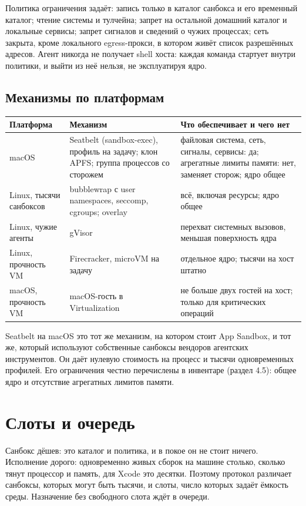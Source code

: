 Политика ограничения задаёт: запись только в каталог санбокса и его временный каталог; чтение системы и тулчейна; запрет на остальной домашний каталог и локальные сервисы; запрет сигналов и сведений о чужих процессах; сеть закрыта, кроме локального egress-прокси, в котором живёт список разрешённых адресов. Агент никогда не получает shell хоста: каждая команда стартует внутри политики, и выйти из неё нельзя, не эксплуатируя ядро.

\subsection{Механизмы по платформам}

\begin{center}
\small
\begin{tabular}{p{2.3cm} p{5.3cm} p{6.0cm}}
\toprule
Платформа & Механизм & Что обеспечивает и чего нет \\
\midrule
macOS & Seatbelt (sandbox-exec), профиль на задачу; клон APFS; группа процессов со сторожем & файловая система, сеть, сигналы, сервисы: да; агрегатные лимиты памяти: нет, заменяет сторож; ядро общее \\
Linux, тысячи санбоксов & bubblewrap с user namespaces, seccomp, cgroups; overlay & всё, включая ресурсы; ядро общее \\
Linux, чужие агенты & gVisor & перехват системных вызовов, меньшая поверхность ядра \\
Linux, прочность VM & Firecracker, microVM на задачу & отдельное ядро; тысячи на хост штатно \\
macOS, прочность VM & macOS-гость в Virtualization & не больше двух гостей на хост; только для критических операций \\
\bottomrule
\end{tabular}
\end{center}

Seatbelt на macOS это тот же механизм, на котором стоит App Sandbox, и тот же, который используют собственные санбоксы вендоров агентских инструментов. Он даёт нулевую стоимость на процесс и тысячи одновременных профилей. Его ограничения честно перечислены в инвентаре (раздел 4.5): общее ядро и отсутствие агрегатных лимитов памяти.

\section{Слоты и очередь}

Санбокс дёшев: это каталог и политика, и в покое он не стоит ничего. Исполнение дорого: одновременно живых сборок на машине столько, сколько тянут процессор и память, для Xcode это десятки. Поэтому протокол различает санбоксы, которых могут быть тысячи, и слоты, число которых задаёт ёмкость среды. Назначение без свободного слота ждёт в очереди.

